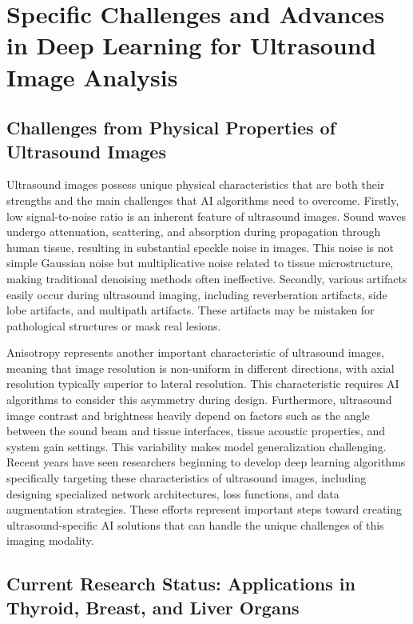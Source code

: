 \section{Specific Challenges and Advances in Deep Learning for Ultrasound Image Analysis}

\subsection{Challenges from Physical Properties of Ultrasound Images}

Ultrasound images possess unique physical characteristics that are both their strengths and the main challenges that AI algorithms need to overcome. Firstly, low signal-to-noise ratio is an inherent feature of ultrasound images. Sound waves undergo attenuation, scattering, and absorption during propagation through human tissue, resulting in substantial speckle noise in images. This noise is not simple Gaussian noise but multiplicative noise related to tissue microstructure, making traditional denoising methods often ineffective. Secondly, various artifacts easily occur during ultrasound imaging, including reverberation artifacts, side lobe artifacts, and multipath artifacts. These artifacts may be mistaken for pathological structures or mask real lesions.

Anisotropy represents another important characteristic of ultrasound images, meaning that image resolution is non-uniform in different directions, with axial resolution typically superior to lateral resolution. This characteristic requires AI algorithms to consider this asymmetry during design. Furthermore, ultrasound image contrast and brightness heavily depend on factors such as the angle between the sound beam and tissue interfaces, tissue acoustic properties, and system gain settings. This variability makes model generalization challenging. Recent years have seen researchers beginning to develop deep learning algorithms specifically targeting these characteristics of ultrasound images, including designing specialized network architectures, loss functions, and data augmentation strategies. These efforts represent important steps toward creating ultrasound-specific AI solutions that can handle the unique challenges of this imaging modality.

\subsection{Current Research Status: Applications in Thyroid, Breast, and Liver Organs}


